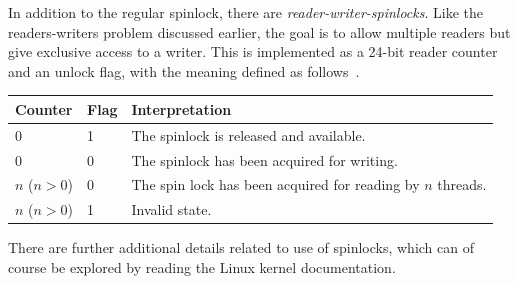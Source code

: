 In addition to the regular spinlock, there are \textit{reader-writer-spinlocks}. Like the readers-writers problem discussed earlier, the goal is to allow multiple readers but give exclusive access to a writer. This is implemented as a 24-bit reader counter and an unlock flag, with the meaning defined as follows~\cite{osi}.

\begin{center}
\begin{tabular}{l|l|l}
	\textbf{Counter} & \textbf{Flag} & \textbf{Interpretation}\\\hline
	0 & 1 & The spinlock is released and available. \\
	0 & 0 & The spinlock has been acquired for writing.\\
	$n$ ($n > 0$) & 0 & The spin lock has been acquired for reading by $n$ threads.\\
	$n$ ($n > 0$) & 1 & Invalid state.\\
\end{tabular}
\end{center}

There are further additional details related to use of spinlocks, which can of course be explored by reading the Linux kernel documentation.





